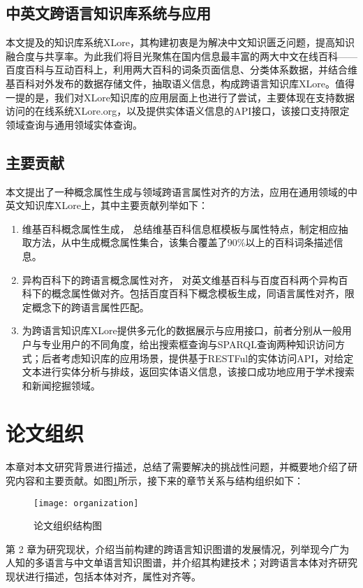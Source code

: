 \subsection{中英文跨语言知识库系统与应用}
本文提及的知识库系统XLore，其构建初衷是为解决中文知识匮乏问题，提高知识融合度与共享率。为此我们将目光聚焦在国内信息最丰富的两大中文在线百科——百度百科与互动百科上，利用两大百科的词条页面信息、分类体系数据，并结合维基百科对外发布的数据存储文件，抽取语义信息，构成跨语言知识库XLore。值得一提的是，我们对XLore知识库的应用层面上也进行了尝试，主要体现在支持数据访问的在线系统XLore.org，以及提供实体语义信息的API接口，该接口支持限定领域查询与通用领域实体查询。

\subsection{主要贡献}
本文提出了一种概念属性生成与领域跨语言属性对齐的方法，应用在通用领域的中英文知识库XLore上，其中主要贡献列举如下：
\begin{enumerate}[1)]
\item {\heiti 维基百科概念属性生成，} 总结维基百科信息框模板与属性特点，制定相应抽取方法，从中生成概念属性集合，该集合覆盖了90\%以上的百科词条描述信息。
\item {\heiti 异构百科下的跨语言概念属性对齐，} 对英文维基百科与百度百科两个异构百科下的概念属性做对齐。包括百度百科下概念模板生成，同语言属性对齐，限定概念下的跨语言属性匹配。
\item {\heiti 为跨语言知识库XLore提供多元化的数据展示与应用接口，}前者分别从一般用户与专业用户的不同角度，给出搜索框查询与SPARQL查询两种知识访问方式；后者考虑知识库的应用场景，提供基于RESTFul的实体访问API，对给定文本进行实体分析与排歧，返回实体语义信息，该接口成功地应用于学术搜索和新闻挖掘领域。
\end{enumerate}

\section{论文组织}

本章对本文研究背景进行描述，总结了需要解决的挑战性问题，并概要地介绍了研究内容和主要贡献。如图\ref{fig:organization}所示，接下来的章节关系与结构组织如下：

\begin{figure}[ht] 
  \centering
  \texttt{[image: organization]}
  \caption{论文组织结构图}
  \label{fig:organization}
\end{figure}

第 2 章为研究现状，介绍当前构建的跨语言知识图谱的发展情况，列举现今广为人知的多语言与中文单语言知识图谱，并介绍其构建技术；对跨语言本体对齐研究现状进行描述，包括本体对齐，属性对齐等。

